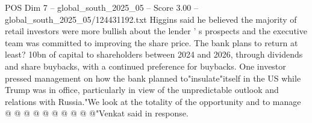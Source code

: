 \begin{textsample}{POS Dim 7 – global\_south\_2025\_05 – Score 3.00 – global\_south\_2025\_05/124431192.txt}
Higgins said he believed the majority of retail investors were more bullish about the lender ' s prospects and the executive team was committed to improving the share price.
The bank plans to return at least? 10bn of capital to shareholders between 2024 and 2026, through dividends and share buybacks, with a continued preference for buybacks.
One investor pressed management on how the bank planned to"insulate"itself in the US while Trump was in office, particularly in view of the unpredictable outlook and relations with Russia."We look at the totality of the opportunity and to manage @ @ @ @ @ @ @ @ @ @"Venkat said in response.

\end{textsample}
